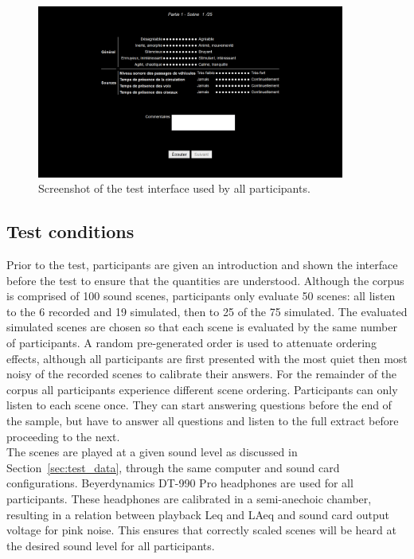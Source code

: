 \documentclass[11pt,a4paper]{article}
\begin{document}
\begin{figure}
    \centering
    \includegraphics[width=0.9\textwidth]{figures/interface.png}
    \caption{Screenshot of the test interface used by all participants.}\label{fig:interface}
\end{figure}

\subsection{Test conditions}

Prior to the test, participants are given an introduction and shown the interface before the test to ensure that the quantities are understood. Although the corpus is comprised of 100 sound scenes, participants only evaluate 50 scenes: all listen to the 6 recorded and 19 simulated, then to 25 of the 75 simulated. The evaluated simulated scenes are chosen so that each scene is evaluated by the same number of participants. A random pre-generated order is used to attenuate ordering effects, although all participants are first presented with the most quiet then most noisy of the recorded scenes to calibrate their answers. For the remainder of the corpus all participants experience different scene ordering. Participants can only listen to each scene once. They can start answering questions before the end of the sample, but have to answer all questions and listen to the full extract before proceeding to the next.\\

The scenes are played at a given sound level as discussed in Section~\ref{sec:test_data}, through the same computer and sound card configurations. Beyerdynamics DT-990 Pro headphones are used for all participants. These headphones are calibrated in a semi-anechoic chamber, resulting in a relation between playback Leq and LAeq and sound card output voltage for pink noise. This ensures that correctly scaled scenes will be heard at the desired sound level for all participants.\\
\end{document}
